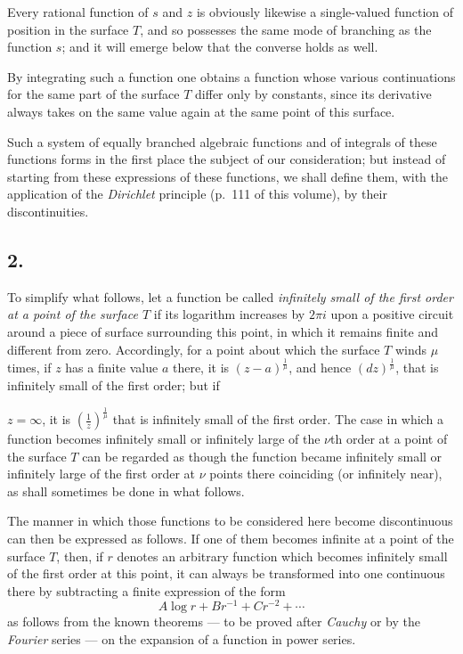 \documentclass{article}
\begin{document}
Every rational function of $s$ and $z$ is obviously likewise a single-valued function of position in the surface $T$, and so possesses the same mode of branching as the function $s$; and it will emerge below that the converse holds as well.

By integrating such a function one obtains a function whose various continuations for the same part of the surface $T$ differ only by constants, since its derivative always takes on the same value again at the same point of this surface.

Such a system of equally branched algebraic functions and of integrals of these functions forms in the first place the subject of our consideration; but instead of starting from these expressions of these functions, we shall define them, with the application of the \emph{Dirichlet} principle (p.~111 of this volume), by their discontinuities.

\subsection*{2.}

To simplify what follows, let a function be called \emph{infinitely small of the first order at a point of the surface $T$} if its logarithm increases by $2\pi i$ upon a positive circuit around a piece of surface surrounding this point, in which it remains finite and different from zero. Accordingly, for a point about which the surface $T$ winds $\mu$ times, if $z$ has a finite value $a$ there, it is $(z-a)^{\frac{1}{\mu}}$, and hence $(dz)^{\frac{1}{\mu}}$, that is infinitely small of the first order; but if

$z = \infty$, it is $\left(\frac{1}{z}\right)^{\frac{1}{\mu}}$ that is infinitely small of the first order. The case in which a function becomes infinitely small or infinitely large of the $\nu$th order at a point of the surface $T$ can be regarded as though the function became infinitely small or infinitely large of the first order at $\nu$ points there coinciding (or infinitely near), as shall sometimes be done in what follows.

The manner in which those functions to be considered here become discontinuous can then be expressed as follows. If one of them becomes infinite at a point of the surface $T$, then, if $r$ denotes an arbitrary function which becomes infinitely small of the first order at this point, it can always be transformed into one continuous there by subtracting a finite expression of the form
\[ A \log r + B r^{-1} + C r^{-2} + \cdots \]
as follows from the known theorems --- to be proved after \emph{Cauchy} or by the \emph{Fourier} series --- on the expansion of a function in power series.
\end{document}
